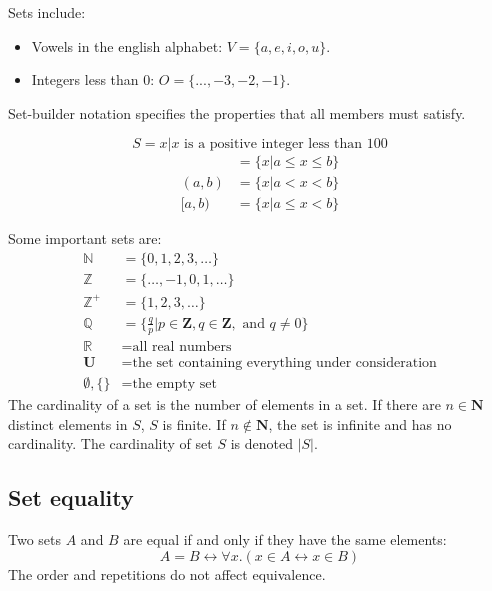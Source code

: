 \begin{example}
    Sets include:
    \begin{itemize}
        \item Vowels in the english alphabet: \(V = \{a, e, i, o, u\}\).
        \item Integers less than \(0\): \(O = \{..., -3, -2, -1\}\).
    \end{itemize}
\end{example}
Set-builder notation specifies the properties that all members must satisfy.
\begin{example}
    \begin{equation*}
        S = {x | x \text{ is a positive integer less than } 100}
    \end{equation*}
    \begin{align*}
        [a, b] & = \{x | a \leq x \leq b\} \\
        (a, b) & =\{x | a < x < b\}        \\
        [a, b) & =\{x | a \leq x < b\}
    \end{align*}
\end{example}
Some important sets are:
\begin{align*}
    \mathbb{N}      & = \{0, 1, 2, 3, \dots\}                                                       \\
    \mathbb{Z}      & = \{\dots, -1, 0, 1, \dots\}                                                  \\
    \mathbb{Z^+}    & = \{1, 2, 3, \dots\}                                                          \\
    \mathbb{Q}      & = \{\frac{q}{p} | p \in \mathbf{Z}, q \in \mathbf{Z}, \text{ and } q \ne 0 \} \\
    \mathbb{R}      & = \text{all real numbers}                                                     \\
    \mathbf{U}      & = \text{the set containing everything under consideration}                    \\
    \emptyset, \{\} & = \text{the empty set}
\end{align*}
The cardinality of a set is the number of elements in a set. If there are \(n \in \mathbf{N}\) distinct elements in \(S\), \(S\) is finite. If \(n \notin \mathbf{N}\), the set is infinite and has no cardinality. The cardinality of set \(S\) is denoted \(|S|\).

\subsection{Set equality}
Two sets \(A\) and \(B\) are equal if and only if they have the same elements:
\begin{equation}
    \label{eq:set_equivalence}
    A = B \leftrightarrow \forall x. (x \in A \leftrightarrow x \in B)
\end{equation}
The order and repetitions do not affect equivalence.

